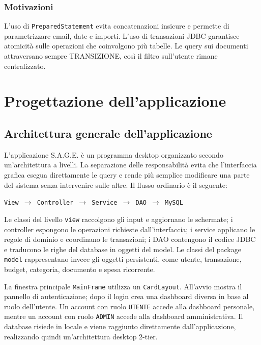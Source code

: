 \documentclass[11pt,a4paper]{article}
\begin{document}
\subsubsection{Motivazioni}
L'uso di \texttt{PreparedStatement} evita concatenazioni insicure e permette di parametrizzare email, date e importi. L'uso di transazioni JDBC garantisce atomicità sulle operazioni che coinvolgono più tabelle. Le query sui documenti attraversano sempre \textsc{TRANSIZIONE}, così il filtro sull'utente rimane centralizzato.

\section{Progettazione dell’applicazione}
\subsection{Architettura generale dell’applicazione}
L'applicazione S.A.G.E. è un programma desktop organizzato secondo un'architettura a livelli. La separazione delle responsabilità evita che l'interfaccia grafica esegua direttamente le query e rende più semplice modificare una parte del sistema senza intervenire sulle altre. Il flusso ordinario è il seguente:

\begin{center}
\texttt{View $\rightarrow$ Controller $\rightarrow$ Service $\rightarrow$ DAO $\rightarrow$ MySQL}
\end{center}

Le classi del livello \texttt{view} raccolgono gli input e aggiornano le schermate; i controller espongono le operazioni richieste dall'interfaccia; i service applicano le regole di dominio e coordinano le transazioni; i DAO contengono il codice JDBC e traducono le righe del database in oggetti del model. Le classi del package \texttt{model} rappresentano invece gli oggetti persistenti, come utente, transazione, budget, categoria, documento e spesa ricorrente.

La finestra principale \texttt{MainFrame} utilizza un \texttt{CardLayout}. All'avvio mostra il pannello di autenticazione; dopo il login crea una dashboard diversa in base al ruolo dell'utente. Un account con ruolo \texttt{UTENTE} accede alla dashboard personale, mentre un account con ruolo \texttt{ADMIN} accede alla dashboard amministrativa. Il database risiede in locale e viene raggiunto direttamente dall'applicazione, realizzando quindi un'architettura desktop 2-tier.
\end{document}
